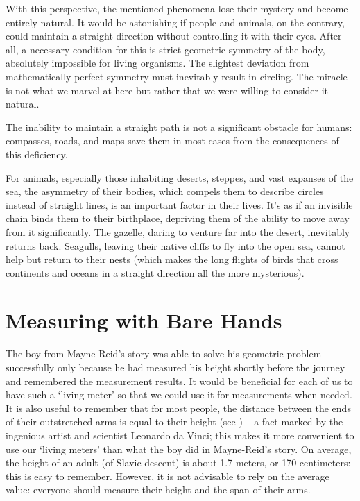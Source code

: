 With this perspective, the mentioned phenomena lose their mystery and become entirely natural. It would be astonishing if people and animals, on the contrary, could maintain a straight direction without controlling it with their eyes. After all, a necessary condition for this is strict geometric symmetry of the body, absolutely impossible for living organisms. The slightest deviation from mathematically perfect symmetry must inevitably result in circling. The miracle is not what we marvel at here but rather that we were willing to consider it natural.

The inability to maintain a straight path is not a significant obstacle for humans: compasses, roads, and maps save them in most cases from the consequences of this deficiency.

For animals, especially those inhabiting deserts, steppes, and vast expanses of the sea, the asymmetry of their bodies, which compels them to describe circles instead of straight lines, is an important factor in their lives. It's as if an invisible chain binds them to their birthplace, depriving them of the ability to move away from it significantly. The gazelle, daring to venture far into the desert, inevitably returns back. Seagulls, leaving their native cliffs to fly into the open sea, cannot help but return to their nests (which makes the long flights of birds that cross continents and oceans in a straight direction all the more mysterious).


\section{Measuring with Bare Hands}
\label{sec-8.8}

The boy from Mayne-Reid's story was able to solve his geometric problem successfully only because he had measured his height shortly before the journey and remembered the measurement results. It would be beneficial for each of us to have such a `living meter' so that we could use it for measurements when needed. It is also useful to remember that for most people, the distance between the ends of their outstretched arms is equal to their height (see ) -- a fact marked by the ingenious artist and scientist Leonardo da Vinci; this makes it more convenient to use our `living meters' than what the boy did in Mayne-Reid's story. On average, the height of an adult (of Slavic descent) is about 1.7 meters, or 170 centimeters: this is easy to remember. However, it is not advisable to rely on the average value: everyone should measure their height and the span of their arms.

